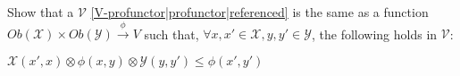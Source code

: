 
Show that a $\mathcal{V}$ \ref{V-profunctor|profunctor|referenced} is the same as a function $Ob(\mathcal{X})\times Ob(\mathcal{Y}) \xrightarrow{\phi} V$ such that, $\forall x,x' \in \mathcal{X}, y,y' \in \mathcal{Y}$, the following holds in $\mathcal{V}$:

    $\mathcal{X}(x',x)\otimes \phi(x,y) \otimes \mathcal{Y}(y,y') \leq \phi(x',y')$